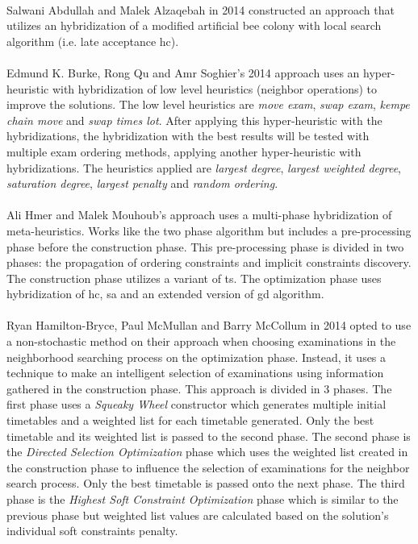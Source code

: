 \\
Salwani Abdullah and Malek Alzaqebah in 2014 constructed an approach \cite{Alzaqebah2014} that utilizes an hybridization of a modified artificial bee colony with local search algorithm (i.e. late acceptance \gls{hc}).\\
\\
Edmund K. Burke, Rong Qu and Amr Soghier's 2014 approach \cite{Burke2014} uses an hyper-heuristic with hybridization of low level heuristics (neighbor operations) to improve the solutions. The low level heuristics are \textit{move exam}, \textit{swap exam}, \textit{kempe chain move} and \textit{swap times lot}. After applying this hyper-heuristic with the hybridizations, the hybridization with the best results will be tested with multiple exam ordering methods, applying another hyper-heuristic with hybridizations. The heuristics applied are \textit{largest degree}, \textit{largest weighted degree}, \textit{saturation degree}, \textit{largest penalty} and \textit{random ordering}.\\
\\
Ali Hmer and Malek Mouhoub's approach \cite{Mouhoub2014} uses a multi-phase hybridization of meta-heuristics. Works like the two phase algorithm but includes a pre-processing phase before the construction phase. This pre-processing phase is divided in two phases: the propagation of ordering constraints and implicit constraints discovery. The construction phase utilizes a variant of \gls{ts}. The optimization phase uses hybridization of \gls{hc}, \gls{sa} and an extended version of \gls{gd} algorithm.\\
\\
Ryan Hamilton-Bryce, Paul McMullan and Barry McCollum in 2014 opted to use a non-stochastic method on their approach \cite{Hamilton-Bryce2014} when choosing examinations in the neighborhood searching process on the optimization phase. Instead, it uses a technique to make an intelligent selection of examinations using information gathered in the construction phase. This approach is divided in 3 phases. The first phase uses a \textit{Squeaky Wheel} constructor which generates multiple initial timetables and a weighted list for each timetable generated. Only the best timetable and its weighted list is passed to the second phase. The second phase is the \textit{Directed Selection Optimization} phase which uses the weighted list created in the construction phase to influence the selection of examinations for the neighbor search process. Only the best timetable is passed onto the next phase. The third phase is the \textit{Highest Soft Constraint Optimization} phase which is similar to the previous phase but weighted list values are calculated based on the solution's individual soft constraints penalty.\\

